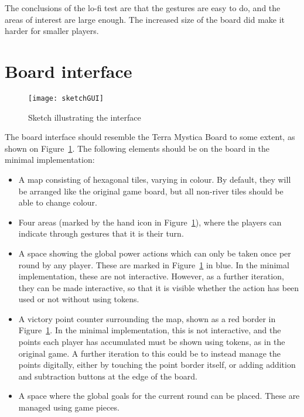 The conclusions of the lo-fi test are that the gestures are easy to do, and the areas of interest are large enough. The increased size of the board did make it harder for smaller players.

\section{Board interface}\label{sec:BoardInterface}
\begin{figure}
\centering
\texttt{[image: sketchGUI]}
\caption{Sketch illustrating the interface}
\label{fig:sketchGUI}
\end{figure}

The board interface should resemble the Terra Mystica Board to some extent, as shown on Figure~\ref{fig:sketchGUI}. The following elements should be on the board in the minimal implementation:
\begin{itemize}
\item A map consisting of hexagonal tiles, varying in colour. By default, they will be arranged like the original game board, but all non-river tiles should be able to change colour.
\item Four areas (marked by the hand icon in Figure~\ref{fig:sketchGUI}), where the players can indicate through gestures that it is their turn.
\item A space showing the global power actions which can only be taken once per round by any player. These are marked in Figure~\ref{fig:sketchGUI} in blue. In the minimal implementation, these are not interactive. However, as a further iteration, they can be made interactive, so that it is visible whether the action has been used or not without using tokens.
\item A victory point counter surrounding the map, shown as a red border in Figure~\ref{fig:sketchGUI}. In the minimal implementation, this is not interactive, and the points each player has accumulated must be shown using tokens, as in the original game. A further iteration to this could be to instead manage the points digitally, either by touching the point border itself, or adding addition and subtraction buttons at the edge of the board.
\item A space where the global goals for the current round can be placed. These are managed using game pieces.
\end{itemize}

